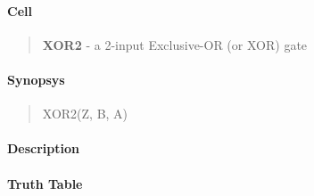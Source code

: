 \label{XOR2}
\paragraph{Cell}
\begin{quote}
    \textbf{XOR2} - a 2-input Exclusive-OR (or XOR) gate
\end{quote}

\paragraph{Synopsys}
\begin{quote}
    XOR2(Z, B, A)
\end{quote}

\paragraph{Description}

%

\paragraph{Truth Table}


